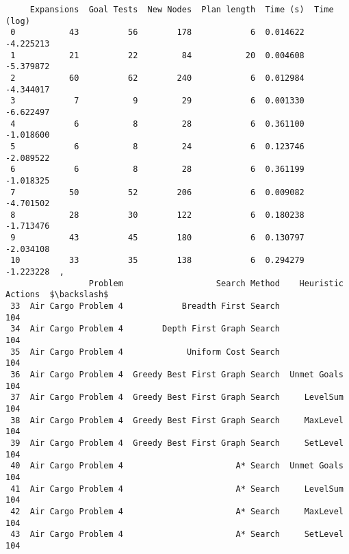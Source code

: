 \documentclass{article}
\begin{document}
\begin{verbatim}
     Expansions  Goal Tests  New Nodes  Plan length  Time (s)  Time (log)  
 0           43          56        178            6  0.014622   -4.225213  
 1           21          22         84           20  0.004608   -5.379872  
 2           60          62        240            6  0.012984   -4.344017  
 3            7           9         29            6  0.001330   -6.622497  
 4            6           8         28            6  0.361100   -1.018600  
 5            6           8         24            6  0.123746   -2.089522  
 6            6           8         28            6  0.361199   -1.018325  
 7           50          52        206            6  0.009082   -4.701502  
 8           28          30        122            6  0.180238   -1.713476  
 9           43          45        180            6  0.130797   -2.034108  
 10          33          35        138            6  0.294279   -1.223228  ,
                 Problem                   Search Method    Heuristic  Actions  $\backslash$
 33  Air Cargo Problem 4            Breadth First Search                   104   
 34  Air Cargo Problem 4        Depth First Graph Search                   104   
 35  Air Cargo Problem 4             Uniform Cost Search                   104   
 36  Air Cargo Problem 4  Greedy Best First Graph Search  Unmet Goals      104   
 37  Air Cargo Problem 4  Greedy Best First Graph Search     LevelSum      104   
 38  Air Cargo Problem 4  Greedy Best First Graph Search     MaxLevel      104   
 39  Air Cargo Problem 4  Greedy Best First Graph Search     SetLevel      104   
 40  Air Cargo Problem 4                       A* Search  Unmet Goals      104   
 41  Air Cargo Problem 4                       A* Search     LevelSum      104   
 42  Air Cargo Problem 4                       A* Search     MaxLevel      104   
 43  Air Cargo Problem 4                       A* Search     SetLevel      104   
 

\end{verbatim}
\end{document}
